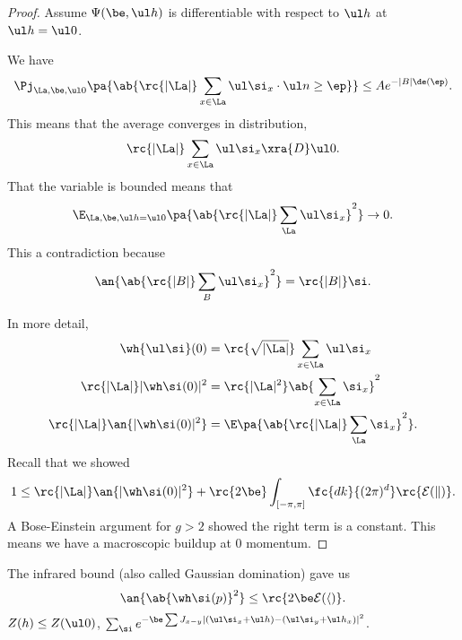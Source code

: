 \begin{proof}
Assume $\Psi(\be, \ul h)$ is differentiable with respect to $\ul h$ at $\ul h=\ul 0$. 

We have 
\[
\Pj_{\La,\be, \ul 0}\pa{
\ab{\rc{|\La|}\sum_{x\in \La} \ul \si_x \cdot \ul n\ge \ep 
}}\le A e^{-|B|\de(\ep)}.
\]
This means that the average converges in distribution,
\[
\rc{|\La|}\sum_{x\in \La} \ul \si_x \xra{D} \ul 0.
\]
That the variable is bounded means that
\[
\E_{\La, \be, \ul h = \ul 0} \pa{\ab{\rc{|\La|} \sum_\La \ul\si_x}^2}\to 0.
\]
This a contradiction because 
\[
\an{\ab{\rc{|B|} \sum_B \ul\si_x}^2} = \rc{|B|} \si.
\]

In more detail,
\begin{align}
\wh{\ul \si}(0)& = \rc{\sqrt{|\La|}} \sum_{x\in \La} \ul \si_x\\
\rc{|\La|}|\wh \si(0)|^2 &= \rc{|\La|^2} \ab{\sum_{x\in \La} \si_x}^2\\
\rc{|\La|} \an{|\wh\si(0)|^2} &= \E\pa{\ab{\rc{|\La|} \sum_\La \si_x}^2}.
\end{align}
Recall that we showed
\[
1\le \rc{|\La|} \an{|\wh \si(0)|^2} + \rc{2\be} \int_{[-\pi,\pi]} \fc{dk}{(2\pi)^d} \rc{\cal E(k)}.
\]
A Bose-Einstein argument for $g>2$ showed the right term is a constant. This means we have a macroscopic buildup at 0 momentum.
\end{proof}


The infrared bound (also called Gaussian domination) gave us
\[
\an{\ab{\wh \si(p)}^2} \le \rc{2\be \cal E(h)}.
\]
$Z(h)\le Z(\ul 0)$, $\sum_\si e^{-\be \sum J_{x-y} |(\ul \si_x + \ul h)- (\ul \si_y+\ul h_x)|^2}$.


